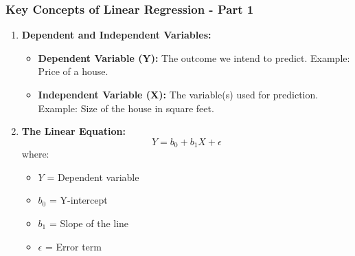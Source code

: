 \documentclass[aspectratio=169]{beamer}
\begin{document}
\begin{frame}[fragile]
    \frametitle{Key Concepts of Linear Regression - Part 1}
    \begin{enumerate}
        \item \textbf{Dependent and Independent Variables:}
            \begin{itemize}
                \item \textbf{Dependent Variable (Y):} The outcome we intend to predict. Example: Price of a house.
                \item \textbf{Independent Variable (X):} The variable(s) used for prediction. Example: Size of the house in square feet.
            \end{itemize}

        \item \textbf{The Linear Equation:}
            \begin{equation}
            Y = b_0 + b_1X + \epsilon
            \end{equation}
            where:
            \begin{itemize}
                \item \(Y\) = Dependent variable
                \item \(b_0\) = Y-intercept
                \item \(b_1\) = Slope of the line
                \item \(\epsilon\) = Error term
            \end{itemize}
    \end{enumerate}
\end{frame}
\end{document}
